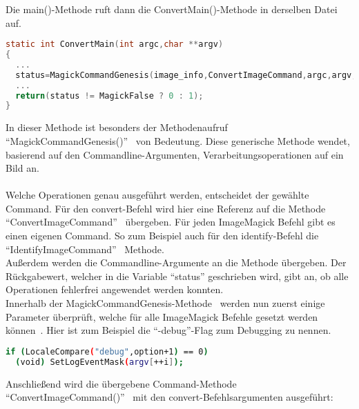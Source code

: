 Die main()-Methode ruft dann die ConvertMain()-Methode in derselben Datei~\cite{DeklarationConvertMain} auf.

\begin{lstlisting}[firstnumber=67, language=C, caption=utilities/convert.c ConvertMain(),label={lst:lstlisting}]
static int ConvertMain(int argc,char **argv)
{
  ...
  status=MagickCommandGenesis(image_info,ConvertImageCommand,argc,argv,(char **) NULL,exception);
  ...
  return(status != MagickFalse ? 0 : 1);
}
\end{lstlisting}
\vspace{5mm}

In dieser Methode ist besonders der Methodenaufruf "`MagickCommandGenesis()"'~\cite{AufbauMagickCommandGenesis} von Bedeutung.
Diese generische Methode wendet, basierend auf den Commandline-Argumenten, Verarbeitungsoperationen auf ein Bild an.\\\\
Welche Operationen genau ausgeführt werden, entscheidet der gewählte Command.
Für den convert-Befehl wird hier eine Referenz auf die Methode "`ConvertImageCommand"'~\cite{DeklarationConvertIMageCommand} übergeben.
Für jeden ImageMagick Befehl gibt es einen eigenen Command.
So zum Beispiel auch für den identify-Befehl die "`IdentifyImageCommand"'~\cite{DeklarationIdentifyImageCommand} Methode.\\

Außerdem werden die Commandline-Argumente an die Methode übergeben.
Der Rückgabewert, welcher in die Variable "`status"' geschrieben wird, gibt an, ob alle Operationen fehlerfrei angewendet werden konnten.\\

Innerhalb der MagickCommandGenesis-Methode~\cite{DeklaraitionMagickCommandGenesis} werden nun zuerst einige Parameter überprüft, welche für alle ImageMagick Befehle gesetzt werden können~\cite{MagickCommandGenesisDebugFlag}.
Hier ist zum Beispiel die "`-debug"'-Flag zum Debugging zu nennen.

\begin{lstlisting}[firstnumber=158, language=Bash, caption=wand/migrify.c Debugging Flag in der MagickCommandGenesis-Methode,label={lst:migrifydebug}]
if (LocaleCompare("debug",option+1) == 0)
  (void) SetLogEventMask(argv[++i]);
\end{lstlisting}
\vspace{5mm}

Anschließend wird die übergebene Command-Methode "`ConvertImageCommand()"'~\cite{MagickCommandGenesisCommandAufruf} mit den convert-Befehlsargumenten ausgeführt:

